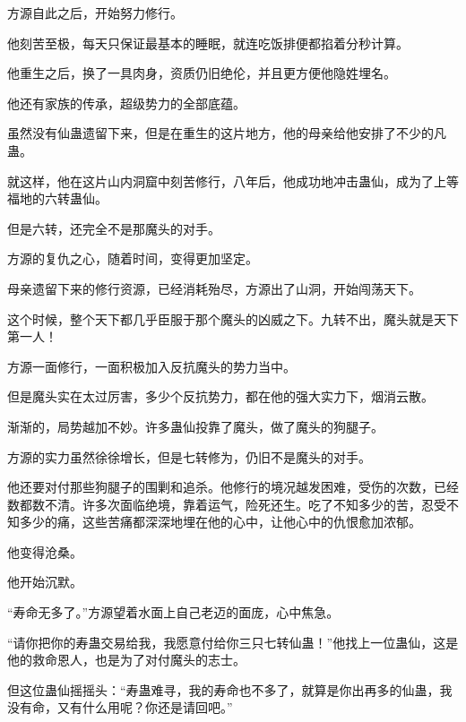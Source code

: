 \begin{this_body}
方源自此之后，开始努力修行。

他刻苦至极，每天只保证最基本的睡眠，就连吃饭排便都掐着分秒计算。

他重生之后，换了一具肉身，资质仍旧绝伦，并且更方便他隐姓埋名。

他还有家族的传承，超级势力的全部底蕴。

虽然没有仙蛊遗留下来，但是在重生的这片地方，他的母亲给他安排了不少的凡蛊。

就这样，他在这片山内洞窟中刻苦修行，八年后，他成功地冲击蛊仙，成为了上等福地的六转蛊仙。

但是六转，还完全不是那魔头的对手。

方源的复仇之心，随着时间，变得更加坚定。

母亲遗留下来的修行资源，已经消耗殆尽，方源出了山洞，开始闯荡天下。

这个时候，整个天下都几乎臣服于那个魔头的凶威之下。九转不出，魔头就是天下第一人！

方源一面修行，一面积极加入反抗魔头的势力当中。

但是魔头实在太过厉害，多少个反抗势力，都在他的强大实力下，烟消云散。

渐渐的，局势越加不妙。许多蛊仙投靠了魔头，做了魔头的狗腿子。

方源的实力虽然徐徐增长，但是七转修为，仍旧不是魔头的对手。

他还要对付那些狗腿子的围剿和追杀。他修行的境况越发困难，受伤的次数，已经数都数不清。许多次面临绝境，靠着运气，险死还生。吃了不知多少的苦，忍受不知多少的痛，这些苦痛都深深地埋在他的心中，让他心中的仇恨愈加浓郁。

他变得沧桑。

他开始沉默。

“寿命无多了。”方源望着水面上自己老迈的面庞，心中焦急。

“请你把你的寿蛊交易给我，我愿意付给你三只七转仙蛊！”他找上一位蛊仙，这是他的救命恩人，也是为了对付魔头的志士。

但这位蛊仙摇摇头：“寿蛊难寻，我的寿命也不多了，就算是你出再多的仙蛊，我没有命，又有什么用呢？你还是请回吧。”

\end{this_body}


